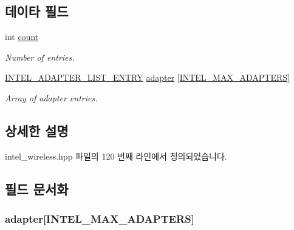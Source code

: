 \subsection*{데이타 필드}
\begin{DoxyCompactItemize}
\item 
int \hyperlink{struct_i_n_t_e_l___a_d_a_p_t_e_r___l_i_s_t_ad43c3812e6d13e0518d9f8b8f463ffcf}{count}
\begin{DoxyCompactList}\small\item\em Number of entries. \end{DoxyCompactList}\item 
\hyperlink{struct_i_n_t_e_l___a_d_a_p_t_e_r___l_i_s_t___e_n_t_r_y}{I\+N\+T\+E\+L\+\_\+\+A\+D\+A\+P\+T\+E\+R\+\_\+\+L\+I\+S\+T\+\_\+\+E\+N\+T\+RY} \hyperlink{struct_i_n_t_e_l___a_d_a_p_t_e_r___l_i_s_t_af47684454cb7b3b85b7b09f6bdb4334a}{adapter} \mbox{[}\hyperlink{intel__wireless_8hpp_a94e87abf1bd04247064d686bd1462160}{I\+N\+T\+E\+L\+\_\+\+M\+A\+X\+\_\+\+A\+D\+A\+P\+T\+E\+RS}\mbox{]}
\begin{DoxyCompactList}\small\item\em Array of adapter entries. \end{DoxyCompactList}\end{DoxyCompactItemize}


\subsection{상세한 설명}


intel\+\_\+wireless.\+hpp 파일의 120 번째 라인에서 정의되었습니다.



\subsection{필드 문서화}
\subsubsection[{\texorpdfstring{adapter}{adapter}}]{ {\bf adapter}\mbox{[}{\bf I\+N\+T\+E\+L\+\_\+\+M\+A\+X\+\_\+\+A\+D\+A\+P\+T\+E\+RS}\mbox{]}}\hypertarget{struct_i_n_t_e_l___a_d_a_p_t_e_r___l_i_s_t_af47684454cb7b3b85b7b09f6bdb4334a}{}\label{struct_i_n_t_e_l___a_d_a_p_t_e_r___l_i_s_t_af47684454cb7b3b85b7b09f6bdb4334a}


